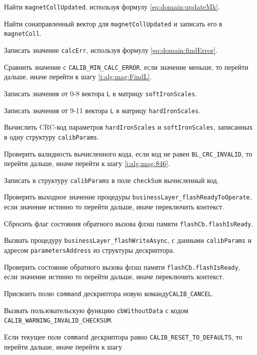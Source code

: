 \begin{enumerate_step}
    \item Найти \lstinline|magnetCollUpdated|, используя формулу \ref{eq:domain:updateMk}.
    \item Найти сонаправленный вектор для \lstinline|magnetCollUpdated| и записать его в \lstinline|magnetColl|.
    \item Записать значение \lstinline|calcErr|, используя формулу \ref{eq:domain:findError}.
    \item Сравнить значение с \lstinline|CALIB_MIN_CALC_ERROR|, если значение меньше, то перейти дальше, иначе перейти к шагу \ref{i:alg:mag:FindL}.
    \item Записать значения от 0-8 вектора \lstinline|L| в матрицу \lstinline|softIronScales|.
    \item Записать значения от 9-11 вектора \lstinline|L| в матрицу \lstinline|hardIronScales|.
    \item Вычислить CRC-код параметров \lstinline|hardIronScales| и \lstinline|softIronScales|, записанных в одну структуру \lstinline|calibParams|.
    \item Проверить валидность вычисленного кода, если код не равен \lstinline|BL_CRC_INVALID|, то перейти дальше, иначе перейти к шагу \ref{i:alg:mag:846}.
    \item Записать в структуру \lstinline|calibParams| в поле \lstinline|checkSum| вычисленный код.
    \item Проверить выходное значение процедуры \lstinline|businessLayer_flashReadyToOperate|, если значение истинно то перейти дальше, иначе переключить контекст.
    \item Сбросить флаг состояния обратного вызова флэш памяти \lstinline|flashCb.flashIsReady|.
    \item Вызвать процедуру \lstinline|businessLayer_flashWriteAsync|, с данными \lstinline|calibParams| и адресом \lstinline|parametersAddress| из структуры дескриптора.
    \item Проверить состояние обратного вызова флэш памяти \lstinline|flashCb.flashIsReady|, если значение истинно то перейти дальше, иначе переключить контекст.
    \item \label{i:alg:mag:846} Присвоить полю \lstinline|command| дескриптора  новую команду\lstinline|CALIB_CANCEL|.
    \item Вызвать пользовательскую функцию \lstinline|cbWithoutData| с кодом \lstinline|CALIB_WARNING_INVALID_CHECKSUM|.
    \item \label{i:alg:mag:1008} Если текущее поле \lstinline|command| дескриптора равно \lstinline|CALIB_RESET_TO_DEFAULTS|, то перейти дальше, иначе перейти к шагу

\end{enumerate_step}

